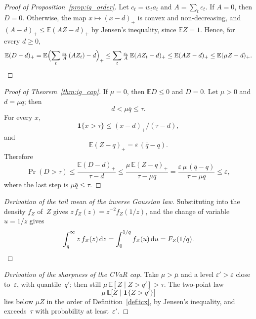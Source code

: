 \documentclass[11pt,a4paper]{article}
\theoremstyle{plain}
\theoremstyle{definition}
\theoremstyle{remark}
\begin{document}
\label{prf:prop:ig_order}
\begin{proof}[Proof of Proposition~\ref{prop:ig_order}]
Let $c_t = w_t a_t$ and $A = \sum_t c_t$.
If $A = 0$, then $D = 0$.
Otherwise, the map $x \mapsto (x-d)_+$ is convex and non-decreasing, and $(A - d)_+ \le \mathbb{E}(AZ - d)_+$ by Jensen's inequality, since $\mathbb{E}Z = 1$.
Hence, for every $d \ge 0$,
\begin{equation}
  \mathbb{E}(D - d)_+
  = \mathbb{E}\Bigl(\sum_t \tfrac{c_t}{A}\,(A Z_t) - d\Bigr)_+
  \le \sum_t \tfrac{c_t}{A}\,\mathbb{E}(A Z_t - d)_+
  \le \mathbb{E}(A Z - d)_+
  \le \mathbb{E}(\mu Z - d)_+ . \qedhere
\end{equation}
\end{proof}

\label{prf:thm:ig_cap}
\begin{proof}[Proof of Theorem~\ref{thm:ig_cap}]
If $\mu = 0$, then $\mathbb{E}D \le 0$ and $D = 0$.
Let $\mu > 0$ and $d = \mu q$; then
\begin{equation}
  d < \mu\bar q \le \tau.
\end{equation}
For every $x$,
\begin{equation}
  \mathbf{1}\{x > \tau\} \le (x-d)_+/(\tau - d),
\end{equation}
and
\begin{equation}
  \mathbb{E}(Z - q)_+ = \varepsilon\,(\bar q - q).
\end{equation}
Therefore
\begin{equation}
  \Pr(D > \tau)
  \le \frac{\mathbb{E}(D-d)_+}{\tau - d}
  \le \frac{\mu\,\mathbb{E}(Z-q)_+}{\tau - \mu q}
  = \frac{\varepsilon\,\mu\,(\bar q - q)}{\tau - \mu q}
  \le \varepsilon,
\end{equation}
where the last step is $\mu\bar q \le \tau$.
\end{proof}

\label{drv:ig_tailmean}
\begin{proof}[Derivation of the tail mean of the inverse Gaussian law]
Substituting into the density $f_Z$ of~$Z$ gives $z\,f_Z(z) = z^{-2} f_Z(1/z)$, and the change of variable $u = 1/z$ gives
\begin{equation}
  \int_q^\infty z\, f_Z(z)\, \mathrm{d}z = \int_0^{1/q} f_Z(u)\, \mathrm{d}u = F_Z(1/q). \qedhere
\end{equation}
\end{proof}

\label{drv:ig_sharp}
\begin{proof}[Derivation of the sharpness of the CVaR cap]
Take $\mu > \bar\mu$ and a level $\varepsilon' > \varepsilon$ close to~$\varepsilon$, with quantile~$q'$; then still $\mu\,\mathbb{E}[Z \mid Z > q'] > \tau$.
The two-point law
\begin{equation}
  \mu\,\mathbb{E}\bigl[Z \mid \mathbf{1}\{Z > q'\}\bigr]
\end{equation}
lies below $\mu Z$ in the order of Definition~\ref{def:icx}, by Jensen's inequality, and exceeds~$\tau$ with probability at least~$\varepsilon'$.
\end{proof}
\end{document}
